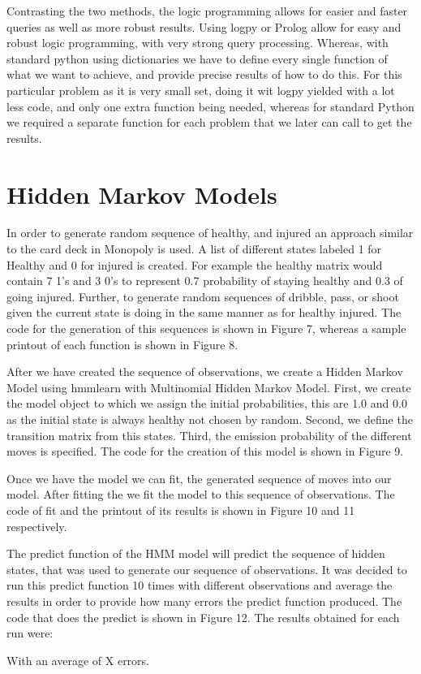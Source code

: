\documentclass[12pt, letter]{article}
\begin{document}
Contrasting the two methods, the logic programming allows for easier and faster queries as well as more robust results. Using logpy or Prolog allow for easy and robust logic programming, with very strong query processing. Whereas, with standard python using dictionaries we have to define every single function of what we want to achieve, and provide precise results of how to do this.  For this particular problem as it is very small set, doing it wit logpy yielded with a lot less code, and only one extra function being needed, whereas for standard Python we required a separate function for each problem that we later can call to get the results. 

\section{Hidden Markov Models}

In order to generate random sequence of healthy, and injured an approach similar to the card deck in Monopoly is used. A list of different states labeled 1 for Healthy and 0 for injured is created. For example the healthy matrix would contain 7 1's and 3 0's to represent 0.7 probability of staying healthy and 0.3 of going injured. Further, to generate random sequences of dribble, pass, or shoot given the current state is doing in the same manner as for healthy injured. The code for the generation of this sequences is shown in Figure 7, whereas a sample printout of each function is shown in Figure 8. 

After we have created the sequence of observations, we create a Hidden Markov Model using hmmlearn with Multinomial Hidden Markov Model. First, we create the model object to which we assign the initial probabilities, this are 1.0 and 0.0 as the initial state is always healthy not chosen by random. Second, we define the transition matrix from this states. Third, the emission probability of the different moves is specified. The code for the creation of this model is shown in Figure 9.

Once we have the model we can fit, the generated sequence of moves into our model. After fitting the we fit the model to this sequence of observations. The code of fit and the printout of its results is shown in Figure 10 and 11 respectively.

The predict function of the HMM model will predict the sequence of hidden states, that was used to generate our sequence of observations. It was decided to run this predict function 10 times with different observations and average the results in order to provide how many errors the predict function produced. The code that does the predict is shown in Figure 12. The results obtained for each run were:

With an average of X errors. 
\end{document}
